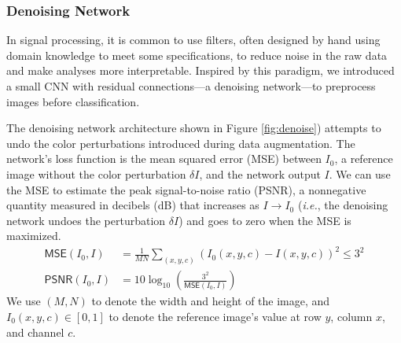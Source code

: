 \documentclass[justified]{article}
\begin{document}
  \subsubsection{Denoising Network}

  In signal processing, it is common to use filters, often designed by hand using domain knowledge to meet some specifications, to reduce noise in the raw data and make analyses more interpretable.
  Inspired by this paradigm, we introduced a small CNN with residual connections---a denoising network---to preprocess images before classification.

  The denoising network architecture shown in Figure \ref{fig:denoise}) attempts to undo the color perturbations introduced during data augmentation.
  The network's loss function is the mean squared error (MSE) between $I_0$, a reference image without the color perturbation $\delta I$, and the network output $I$.
  We can use the MSE to estimate the peak signal-to-noise ratio (PSNR), a nonnegative quantity measured in decibels (dB) that increases as $I \to I_0$ (\textit{i.e.}, the denoising network undoes the perturbation $\delta I$) and goes to zero when the MSE is maximized.
  \begin{equation}
    \begin{split}
      \mathsf{MSE}(I_0, I) &= \frac{1}{MN} \sum_{(x, y, c)} \left(I_0(x, y, c) - I(x, y, c)\right)^2 \leq 3^2 \\
      \mathsf{PSNR}(I_0, I) &= 10 \log_{10} \left(\frac{3^2}{\mathsf{MSE}(I_0, I)}\right)
    \end{split}
  \end{equation}
  We use $(M, N)$ to denote the width and height of the image, and $I_0(x, y, c) \in [0, 1]$ to denote the reference image's value at row $y$, column $x$, and channel $c$.
\end{document}

